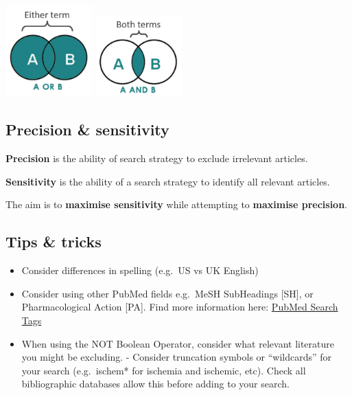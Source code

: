 \documentclass[
]{book}
\providecommand{\tightlist}{%
  \setlength{\itemsep}{0pt}\setlength{\parskip}{0pt}}
\begin{document}
\includegraphics[width=0.25\textwidth,height=0.25\textheight]{figs/booleanOR.png}
\includegraphics[width=0.25\textwidth,height=0.25\textheight]{figs/booleanAND.png}

\hypertarget{precision-sensitivity}{%
\subsection{Precision \& sensitivity}\label{precision-sensitivity}}

\textbf{Precision} is the ability of search strategy to exclude irrelevant articles.

\textbf{Sensitivity} is the ability of a search strategy to identify all relevant articles.

The aim is to \textbf{maximise sensitivity} while attempting to \textbf{maximise precision}.

\hypertarget{tips-tricks}{%
\subsection{Tips \& tricks}\label{tips-tricks}}

\begin{itemize}
\tightlist
\item
  Consider differences in spelling (e.g.~US vs UK English)
\item
  Consider using other PubMed fields e.g.~MeSH SubHeadings {[}SH{]}, or Pharmacological Action {[}PA{]}. Find more information here: \href{https://pubmed.ncbi.nlm.nih.gov/help/\#search-tags}{PubMed Search Tags}
\item
  When using the NOT Boolean Operator, consider what relevant literature you might be excluding. - Consider truncation symbols or ``wildcards'' for your search (e.g.~ischem* for ischemia and ischemic, etc). Check all bibliographic databases allow this before adding to your search.
\end{itemize}
\end{document}
